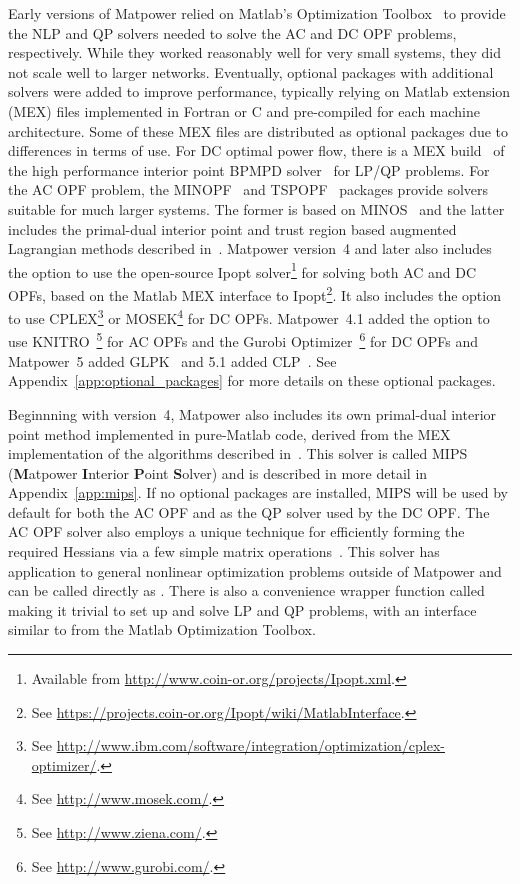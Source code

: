 \documentclass[12pt]{article}
\newcommand{\matlab}[0]{{\sc Matlab}}
\newcommand{\matpower}[0]{{\sc Matpower}}
\newcommand{\mips}[0]{{MIPS}}
\newcommand{\mipsname}[0]{{{\bf M}{\sc atpower} \textbf{I}nterior \textbf{P}oint \textbf{S}olver}}
\newcommand{\ipopt}[0]{{\sc Ipopt}}
\newcommand{\knitro}[0]{{KNITRO}}
\newcommand{\clp}[0]{{CLP}}
\newcommand{\cplex}[0]{{CPLEX}}
\newcommand{\glpk}[0]{{GLPK}}
\newcommand{\gurobi}[0]{{Gurobi}}
\newcommand{\mosek}[0]{{MOSEK}}
\newcommand{\ot}[0]{{Optimization Toolbox}}
\newcommand{\code}[1]{{\relsize{-0.5}{\tt{{#1}}}}}  %
\numberwithin{equation}{section}
\numberwithin{table}{section}
\numberwithin{figure}{section}
\begin{document}
Early versions of \matpower{} relied on \matlab{}'s \ot{}~\cite{ot} to provide the NLP and QP solvers needed to solve the AC and DC OPF problems, respectively. While they worked reasonably well for very small systems, they did not scale well to larger networks. Eventually, optional packages with additional solvers were added to improve performance, typically relying on \matlab{} extension (MEX) files implemented in Fortran or C and pre-compiled for each machine architecture. Some of these MEX files are distributed as optional packages due to differences in terms of use. For DC optimal power flow, there is a MEX build~\cite{bpmpdmex} of the high performance interior point BPMPD solver~\cite{meszaros1996} for LP/QP problems. For the AC OPF problem, the MINOPF~\cite{minopf} and TSPOPF~\cite{tspopf} packages provide solvers suitable for much larger systems. The former is based on MINOS~\cite{murtagh} and the latter includes the primal-dual interior point and trust region based augmented Lagrangian methods described in~\cite{wang2007a}. \matpower{} version~4 and later also includes the option to use the open-source \ipopt{} solver\footnote{Available from \url{http://www.coin-or.org/projects/Ipopt.xml}.} for solving both AC and DC OPFs, based on the \matlab{} MEX interface to \ipopt{}\footnote{See \url{https://projects.coin-or.org/Ipopt/wiki/MatlabInterface}.}. It also includes the option to use \cplex{}\footnote{See \url{http://www.ibm.com/software/integration/optimization/cplex-optimizer/}.} or \mosek{}\footnote{See \url{http://www.mosek.com/}.} for DC OPFs. \matpower{}~4.1 added the option to use \knitro{}~\cite{knitro}\footnote{See \url{http://www.ziena.com/}.} for AC OPFs and the \gurobi{} Optimizer~\cite{gurobi}\footnote{See \url{http://www.gurobi.com/}.} for DC OPFs and \matpower{}~5 added \glpk{}~\cite{glpk} and 5.1 added \clp{}~\cite{clp}. See Appendix~\ref{app:optional_packages} for more details on these optional packages.

Beginnning with version~4, \matpower{} also includes its own primal-dual interior point method implemented in pure-\matlab{} code, derived from the MEX implementation of the algorithms described in~\cite{wang2007a}. This solver is called \mips{} (\mipsname{}) and is described in more detail in Appendix~\ref{app:mips}. If no optional packages are installed, \mips{} will be used by default for both the AC OPF and as the QP solver used by the DC OPF. The AC OPF solver also employs a unique technique for efficiently forming the required Hessians via a few simple matrix operations~\cite{zimmerman2010b, sereeter2018a, sereeter2018b}. This solver has application to general nonlinear optimization problems outside of \matpower{} and can be called directly as \code{mips}. There is also a convenience wrapper function called \code{qps\_mips} making it trivial to set up and solve LP and QP problems, with an interface similar to \code{quadprog} from the \matlab{} \ot{}.
\end{document}

